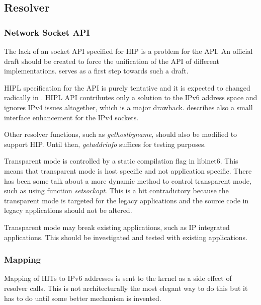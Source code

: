 
\subsection{Resolver}
\label{sec:resolver_future_work}

\subsubsection{Network Socket API}
\label{sec:api_future_work}

The lack of an socket API specified for HIP is a problem for the
API. An official draft should be created to force the unification of
the API of different implementations. \cite{hipapi} serves as a first
step towards such a draft.

HIPL specification for the API  is
purely tentative and it is expected to changed radically in
\cite{hipapi}. HIPL API contributes only a solution to the IPv6
address space and ignores IPv4 issues altogether, which is a major
drawback. \cite{boeing} describes also a small interface enhancement
for the IPv4 sockets.

Other resolver functions, such as \textit{gethostbyname}, should also
be modified to support HIP. Until then, \textit{getaddrinfo} suffices
for testing purposes.

Transparent mode is controlled by a static compilation flag in
libinet6. This means that transparent mode is host specific and not
application specific. There has been some talk about a more dynamic
method to control transparent mode, such as using function
\textit{setsockopt}. This is a bit contradictory because the
transparent mode is targeted for the legacy applications and the
source code in legacy applications should not be altered.

Transparent mode may break existing applications, such as IP
integrated applications. This should be investigated and tested with
existing applications.

\subsubsection{Mapping}
\label{sec:mapping_future_work}

Mapping of HITs to IPv6 addresses is sent to the kernel as a side
effect of resolver calls. This is not architecturally the most elegant
way to do this but it has to do until some better mechanism is
invented.


